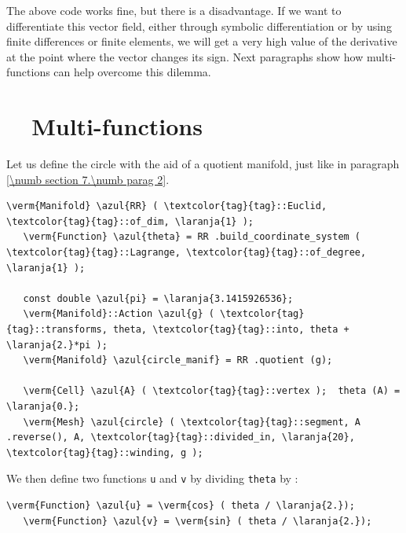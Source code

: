 The above code works fine, but there is a disadvantage.
If we want to differentiate this vector field, either through symbolic differentiation or by using
finite differences or finite elements, we will get a very high value of the derivative at the point
where the vector changes its sign.
Next paragraphs show how multi-functions can help overcome this dilemma.


\section{~~Multi-functions}  \label{\numb section 7.\numb parag 25}

Let us define the circle with the aid of a quotient manifold, just like in paragraph
\ref{\numb section 7.\numb parag 2}.

\begin{Verbatim}[commandchars=\\\{\},formatcom=\small\tt,frame=single,
   label=parag-\ref{\numb section 7.\numb parag 25}.cpp,rulecolor=\color{moldura},
   baselinestretch=0.94,framesep=2mm                                              ]
   \verm{Manifold} \azul{RR} ( \textcolor{tag}{tag}::Euclid, \textcolor{tag}{tag}::of_dim, \laranja{1} );
   \verm{Function} \azul{theta} = RR .build_coordinate_system ( \textcolor{tag}{tag}::Lagrange, \textcolor{tag}{tag}::of_degree, \laranja{1} );

   const double \azul{pi} = \laranja{3.1415926536};
   \verm{Manifold}::Action \azul{g} ( \textcolor{tag}{tag}::transforms, theta, \textcolor{tag}{tag}::into, theta + \laranja{2.}*pi );
   \verm{Manifold} \azul{circle_manif} = RR .quotient (g);

   \verm{Cell} \azul{A} ( \textcolor{tag}{tag}::vertex );  theta (A) = \laranja{0.};
   \verm{Mesh} \azul{circle} ( \textcolor{tag}{tag}::segment, A .reverse(), A, \textcolor{tag}{tag}::divided_in, \laranja{20}, \textcolor{tag}{tag}::winding, g );
\end{Verbatim}

We then define two functions {\small\tt\azul u} and {\small\tt\azul v} by dividing {\small\tt theta}
by {\small\tt{}} :

\begin{Verbatim}[commandchars=\\\{\},formatcom=\small\tt,frame=single,
   label=parag-\ref{\numb section 7.\numb parag 25}.cpp,rulecolor=\color{moldura},
   baselinestretch=0.94,framesep=2mm                                              ]
   \verm{Function} \azul{u} = \verm{cos} ( theta / \laranja{2.});
   \verm{Function} \azul{v} = \verm{sin} ( theta / \laranja{2.});
\end{Verbatim}

